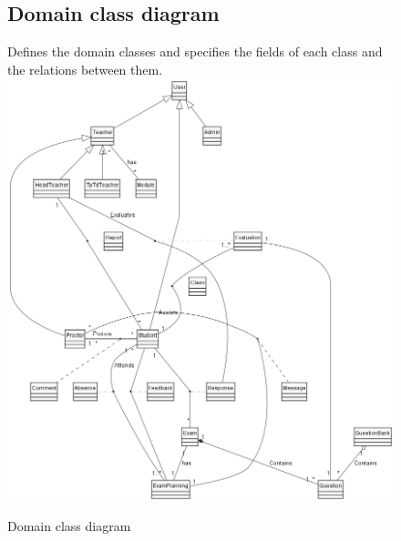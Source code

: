 \documentclass[]{uc2pfecaneva}
\begin{document}
    \begin{figure}
        \subsection{Domain class diagram}
        \raggedright Defines the domain classes and specifies the fields of each class and the relations between them.
        \linebreak
        \includegraphics[width=\textwidth]{images/DCD}
        \caption{Domain class diagram}
    \end{figure}
\end{document}
